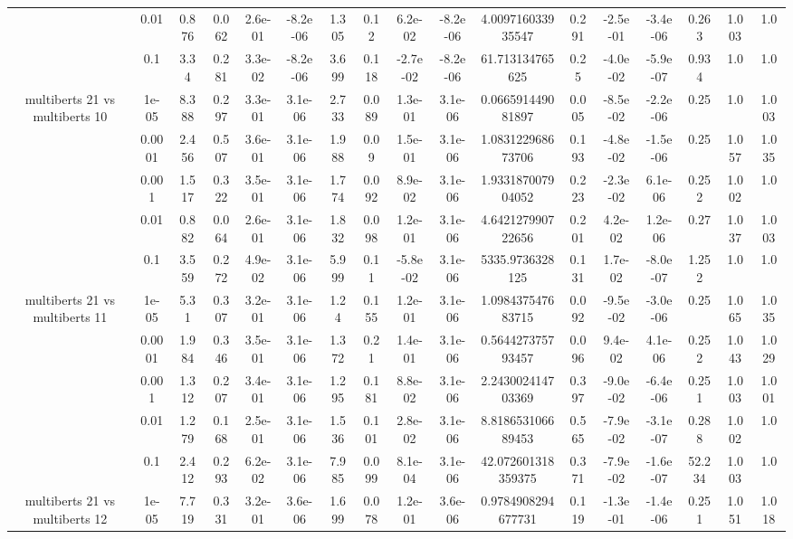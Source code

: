 \begin{tabular}{|c|c|c|c|c|c|c|c|c|c|c|c|c|c|c|c|c|}
 & 0.01 & 0.876 & 0.062 & 2.6e-01 & -8.2e-06 & 1.305 & 0.12 & 6.2e-02 & -8.2e-06 & 4.009716033935547 & 0.291 & -2.5e-01 & -3.4e-06 & 0.263 & 1.003 & 1.0 \\
 & 0.1 & 3.34 & 0.281 & 3.3e-02 & -8.2e-06 & 3.699 & 0.118 & -2.7e-02 & -8.2e-06 & 61.713134765625 & 0.25 & -4.0e-02 & -5.9e-07 & 0.934 & 1.0 & 1.0 \\
\hline
\multirow{5}{*}{multiberts 21 vs multiberts 10} & 1e-05 & 8.388 & 0.297 & 3.3e-01 & 3.1e-06 & 2.733 & 0.089 & 1.3e-01 & 3.1e-06 & 0.066591449081897 & 0.005 & -8.5e-02 & -2.2e-06 & 0.25 & 1.0 & 1.003 \\
 & 0.0001 & 2.456 & 0.507 & 3.6e-01 & 3.1e-06 & 1.988 & 0.09 & 1.5e-01 & 3.1e-06 & 1.083122968673706 & 0.193 & -4.8e-02 & -1.5e-06 & 0.25 & 1.057 & 1.035 \\
 & 0.001 & 1.517 & 0.322 & 3.5e-01 & 3.1e-06 & 1.774 & 0.092 & 8.9e-02 & 3.1e-06 & 1.933187007904052 & 0.223 & -2.3e-02 & 6.1e-06 & 0.252 & 1.002 & 1.0 \\
 & 0.01 & 0.882 & 0.064 & 2.6e-01 & 3.1e-06 & 1.832 & 0.098 & 1.2e-01 & 3.1e-06 & 4.642127990722656 & 0.201 & 4.2e-02 & 1.2e-06 & 0.27 & 1.037 & 1.003 \\
 & 0.1 & 3.559 & 0.272 & 4.9e-02 & 3.1e-06 & 5.999 & 0.11 & -5.8e-02 & 3.1e-06 & 5335.9736328125 & 0.131 & 1.7e-02 & -8.0e-07 & 1.252 & 1.0 & 1.0 \\
\hline
\multirow{5}{*}{multiberts 21 vs multiberts 11} & 1e-05 & 5.31 & 0.307 & 3.2e-01 & 3.1e-06 & 1.24 & 0.155 & 1.2e-01 & 3.1e-06 & 1.098437547683715 & 0.092 & -9.5e-02 & -3.0e-06 & 0.25 & 1.065 & 1.035 \\
 & 0.0001 & 1.984 & 0.346 & 3.5e-01 & 3.1e-06 & 1.372 & 0.21 & 1.4e-01 & 3.1e-06 & 0.564427375793457 & 0.096 & 9.4e-02 & 4.1e-06 & 0.252 & 1.043 & 1.029 \\
 & 0.001 & 1.312 & 0.207 & 3.4e-01 & 3.1e-06 & 1.295 & 0.181 & 8.8e-02 & 3.1e-06 & 2.243002414703369 & 0.397 & -9.0e-02 & -6.4e-06 & 0.251 & 1.003 & 1.001 \\
 & 0.01 & 1.279 & 0.168 & 2.5e-01 & 3.1e-06 & 1.536 & 0.101 & 2.8e-02 & 3.1e-06 & 8.818653106689453 & 0.565 & -7.9e-02 & -3.1e-07 & 0.288 & 1.002 & 1.0 \\
 & 0.1 & 2.412 & 0.293 & 6.2e-02 & 3.1e-06 & 7.985 & 0.099 & 8.1e-04 & 3.1e-06 & 42.072601318359375 & 0.371 & -7.9e-02 & -1.6e-07 & 52.234 & 1.003 & 1.0 \\
\hline
\multirow{5}{*}{multiberts 21 vs multiberts 12} & 1e-05 & 7.719 & 0.331 & 3.2e-01 & 3.6e-06 & 1.699 & 0.078 & 1.2e-01 & 3.6e-06 & 0.9784908294677731 & 0.119 & -1.3e-01 & -1.4e-06 & 0.251 & 1.051 & 1.018 \\

\end{tabular}
